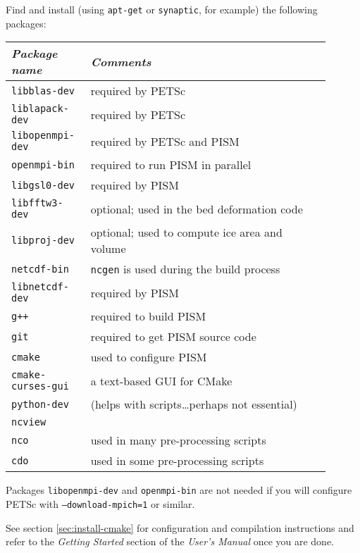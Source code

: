\documentclass[titlepage,letterpaper,final]{scrartcl}
\begin{document}
Find and install (using \texttt{apt-get} or \texttt{synaptic}, for example) the following packages:
\begin{center}
  \begin{tabular*}{0.9\linewidth}{p{0.2\linewidth}p{0.7\linewidth}}
    \toprule
    \emph{Package name} & \emph{Comments}\\
    \midrule
    \texttt{libblas-dev} & required by PETSc\\
    \texttt{liblapack-dev} & required by PETSc \\
    \texttt{libopenmpi-dev} & required by PETSc and PISM \\
    \texttt{openmpi-bin} & required to run PISM in parallel \\
    \texttt{libgsl0-dev} & required by PISM\\
    \texttt{libfftw3-dev} & optional; used in the bed deformation code\\
    \texttt{libproj-dev} & optional; used to compute ice area and volume \\
    \texttt{netcdf-bin} & \texttt{ncgen} is used during the build process \\
    \texttt{libnetcdf-dev} & required by PISM \\
    \texttt{g++} & required to build PISM \\
    \texttt{git} & required to get PISM source code \\
    \texttt{cmake} & used to configure PISM \\
    \texttt{cmake-curses-gui} & a text-based GUI for CMake \\
    \texttt{python-dev} & (helps with scripts\dots perhaps not essential) \\
    \texttt{ncview} & \\
    \texttt{nco} & used in many pre-processing scripts \\
    \texttt{cdo} & used in some pre-processing scripts \\
    \bottomrule
  \end{tabular*}
\end{center}

Packages \texttt{libopenmpi-dev} and \texttt{openmpi-bin} are not needed if you
will configure PETSc with \texttt{--download-mpich=1} or similar.

See section \ref{sec:install-cmake} for configuration and compilation
instructions and refer to the \emph{Getting Started} section of the
\emph{User's Manual} once you are done.

\vspace{0.3in}
\end{document}
